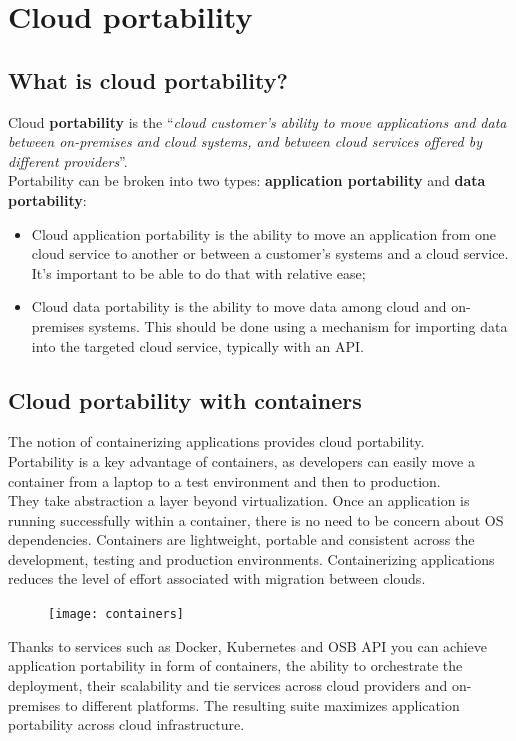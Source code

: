 \documentclass[11pt]{article} %
\begin{document}
\section{Cloud portability}
\subsection{What is cloud portability?}
Cloud \textbf{portability} is the  “\emph{cloud customer’s ability to move applications and data between on-premises and cloud systems, and between cloud services offered by different providers}”. \\
Portability can be broken into two types: \textbf{application portability} and \textbf{data portability}:
\begin{itemize}
\item Cloud application portability is the ability to move an application from one cloud service to another or between a customer's systems and a cloud service. It's important to be able to do that with relative ease;
\item Cloud data portability is the ability to move data among cloud and on-premises systems. This should be done using a mechanism for importing data into the targeted cloud service, typically with an API.
\end{itemize}

\subsection{Cloud portability with containers}
The notion of containerizing applications provides cloud portability. \\
Portability is a key advantage of containers, as developers can easily move a container from a laptop to a test environment and then to production. \\
They take abstraction a layer beyond virtualization. Once an application is running successfully within a container, there is no need to be concern about OS dependencies. Containers are lightweight, portable and consistent across the development, testing and production environments. Containerizing applications reduces the level of effort associated with migration between clouds.

\begin{figure} [H]
	\centering
	\texttt{[image: containers]} \\
\end{figure}

Thanks to services such as Docker, Kubernetes and OSB API you can achieve application portability in form of containers, the ability to orchestrate the deployment, their scalability and tie services across cloud providers and on-premises to different platforms. The resulting suite maximizes application portability across cloud infrastructure.
\end{document}
